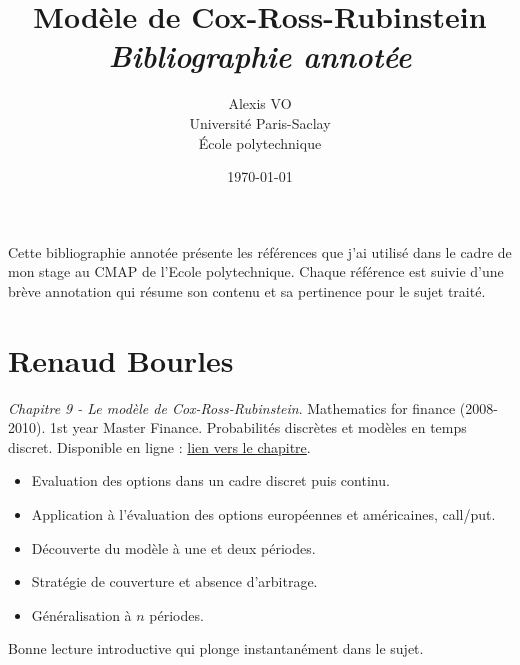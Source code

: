 \documentclass[a4paper,10pt]{article}
\title{\Huge{\textbf{Modèle de Cox-Ross-Rubinstein}}\\ \medskip
      \Huge{\textit{Bibliographie annotée}}\vspace*{0.7cm}}
\author{\LARGE{Alexis VO}\vspace{1cm}\\ \medskip
      Université Paris-Saclay\\École polytechnique}
\date{\vspace{0.2cm}\today}
\begin{document}
\vspace{\fill}
  \maketitle
\vspace{\fill}

\newpage

Cette bibliographie annotée présente les références que j'ai utilisé dans le cadre de mon stage au CMAP de l'Ecole polytechnique. Chaque référence est suivie d'une brève annotation qui résume son contenu et sa pertinence pour le sujet traité.\\ \medskip

\begin{center}
    \tableofcontents    
\end{center}

\newpage

\vspace{1em}

\section*{Renaud Bourles\quad}
{}

\textit{Chapitre 9 - Le modèle de Cox-Ross-Rubinstein}. Mathematics for finance (2008-2010). 1st year Master Finance. Probabilités discrètes et modèles en temps discret.
Disponible en ligne : \href{http://renaud.bourles.perso.centrale-med.fr/MathsFi/Chap%209%20-%20Le%20modele%20Cox-Ross-Rubinstein.pdf}{lien vers le chapitre}.
\begin{itemize}
    \item Evaluation des options dans un cadre discret puis continu.
    \item Application à l'évaluation des options européennes et américaines, call/put.
    \item Découverte du modèle à une et deux périodes.
    \item Stratégie de couverture et absence d'arbitrage.
    \item Généralisation à $n$ périodes.
\end{itemize}
Bonne lecture introductive qui plonge instantanément dans le sujet.\\ 

\vspace{1em}
\end{document}
